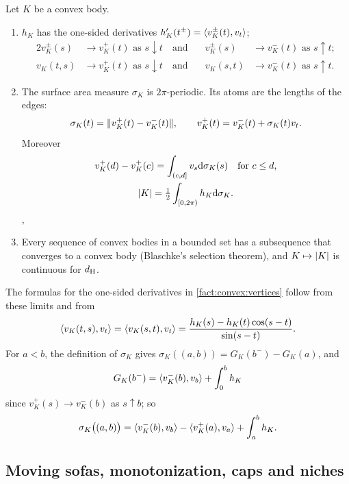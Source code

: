 \begin{fact}\label{fact:convex}
Let $K$ be a convex body.
\begin{enumerate}[label=(\alph*)]
\item\label{fact:convex:vertices} $h_K$ has the one-sided derivatives
$h_K'(t^\pm)=\langle v_K^\pm(t),v_t\rangle$;
\begin{alignat*}{2}
  v_K^\pm(s)&\to v_K^+(t)\text{ as }s\downarrow t\quad\text{and}\quad&
    v_K^\pm(s)&\to v_K^-(t)\text{ as }s\uparrow t;\\
  v_K(t,s)&\to v_K^+(t)\text{ as }s\downarrow t\quad\text{and}\quad&
    v_K(s,t)&\to v_K^-(t)\text{ as }s\uparrow t.
\end{alignat*}
\item\label{fact:convex:sigma} The surface area measure $\sigma_K$ is
$2\pi$-periodic. Its atoms are the lengths of the edges:
\[
  \sigma_K(t)=\lVert v_K^+(t)-v_K^-(t)\rVert,\qquad v_K^+(t)=v_K^-(t)+\sigma_K(t)v_t .
\]
Moreover
\begin{gather*}
  v_K^+(d)-v_K^+(c)=\int_{(c,d]}v_s\mathrm{d}\sigma_K(s)\quad\text{for }c\le d,\\
  \lvert K\rvert=\tfrac12\int_{[0,2\pi)}h_K\mathrm{d}\sigma_K .
\end{gather*}
, \cite[Rem.~5.1.2]{Schneider14}
\item\label{fact:convex:blaschke} Every sequence of convex bodies in a bounded
set has a subsequence that converges to a convex body (Blaschke's selection
theorem), and $K\mapsto\lvert K\rvert$ is continuous for $d_{\mathrm{H}}$. \cite[Section~1.8, in
particular Thm.~1.8.20]{Schneider14}
\end{enumerate}
\end{fact}

The formulas for the one-sided derivatives in \ref{fact:convex:vertices} follow
from these limits and from
\[
  \langle v_K(t,s),v_t\rangle=\langle v_K(s,t),v_t\rangle
    =\frac{h_K(s)-h_K(t)\cos(s-t)}{\sin(s-t)} .
\]
For $a<b$, the definition of $\sigma_K$ gives $\sigma_K((a,b))=G_K(b^-)-G_K(a)$,
and
\[
  G_K(b^-)=\langle v_K^-(b),v_b\rangle+\int_0^bh_K
\]
since $v_K^+(s)\to v_K^-(b)$ as $s\uparrow b$; so
\begin{equation}\label{eq:sigma-open}
  \sigma_K\bigl((a,b)\bigr)=\langle v_K^-(b),v_b\rangle-\langle v_K^+(a),v_a\rangle+\int_a^bh_K .
\end{equation}

\subsection{Moving sofas, monotonization, caps and niches}\label{sec:sofas}

